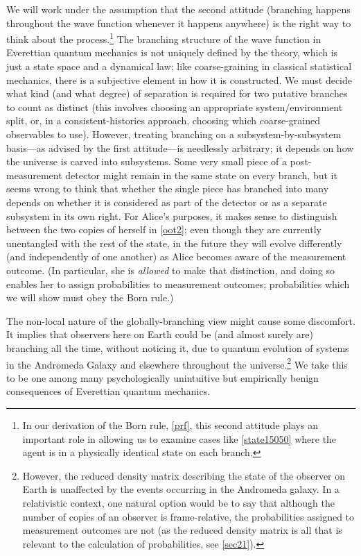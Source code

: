 \documentclass[12pt,onecolumn,secnumarabic,amsmath,amssymb,balancelastpage,nofootinbib]{article}
\begin{document}
We will work under the assumption that the second attitude (branching happens throughout the wave function whenever it happens anywhere) is the right way to think about the process.\footnote{In our derivation of the Born rule, \textsection \ref{prf}, this second attitude plays an important role in allowing us to examine cases like \eqref{state15050} where the agent is in a physically identical state on each branch.} The branching structure of the wave function in Everettian quantum mechanics is not uniquely defined by the theory, which is just a state space and a dynamical law; like coarse-graining in classical statistical mechanics, there is a subjective element in how it is constructed.  We must decide what kind (and what degree) of separation is required for two putative branches to count as distinct (this involves choosing an appropriate system/environment split, or, in a consistent-histories approach, choosing which coarse-grained observables to use). However, treating branching on a subsystem-by-subsystem basis---as advised by the first attitude---is needlessly arbitrary; it depends on how the universe is carved into subsystems. Some very small piece of a post-measurement detector might remain in the same state on every branch, but it seems wrong to think that whether the single piece has branched into many depends on whether it is considered as part of the detector or as a separate subsystem in its own right. For Alice's purposes, it makes sense to distinguish between the two copies of herself in \eqref{oot2}; even though they are currently unentangled with the rest of the state, in the future they will evolve differently (and independently of one another) as Alice becomes aware of the measurement outcome. (In particular, she is \emph{allowed} to make that distinction, and doing so enables her to assign probabilities to measurement outcomes; probabilities which we will show must obey the Born rule.)

The non-local nature of the globally-branching view might cause some discomfort. It implies that observers here on Earth could be (and almost surely are) branching all the time, without noticing it, due to quantum evolution of systems in the Andromeda Galaxy and elsewhere throughout the universe.\footnote{However, the reduced density matrix describing the state of the observer on Earth is unaffected by the events occurring in the Andromeda galaxy.  In a relativistic context, one natural option would be to say that although the number of copies of an observer is frame-relative, the probabilities assigned to measurement outcomes are not (as the reduced density matrix is all that is relevant to the calculation of probabilities, see \textsection \ref{sec21}).} We take this to be one among many psychologically unintuitive but empirically benign consequences of Everettian quantum mechanics.
\end{document}
